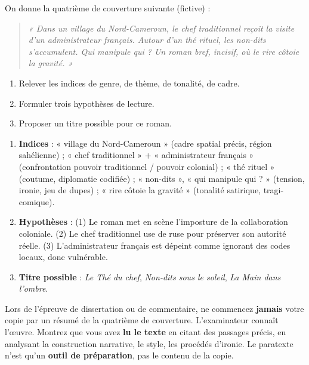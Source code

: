 \documentclass[11pt]{article}
\begin{document}
\begin{exercice}
On donne la quatrième de couverture suivante (fictive) :
\begin{quote}
\emph{« Dans un village du Nord-Cameroun, le chef traditionnel reçoit la visite d'un administrateur français. Autour d'un thé rituel, les non-dits s'accumulent. Qui manipule qui ? Un roman bref, incisif, où le rire côtoie la gravité. »}
\end{quote}
\begin{enumerate}
\item Relever les indices de genre, de thème, de tonalité, de cadre.
\item Formuler trois hypothèses de lecture.
\item Proposer un titre possible pour ce roman.
\end{enumerate}
\end{exercice}

\begin{corrige}[Exercice n°1]
\begin{enumerate}
\item \textbf{Indices} : « village du Nord-Cameroun » (cadre spatial précis, région sahélienne) ; « chef traditionnel » + « administrateur français » (confrontation pouvoir traditionnel / pouvoir colonial) ; « thé rituel » (coutume, diplomatie codifiée) ; « non-dits », « qui manipule qui ? » (tension, ironie, jeu de dupes) ; « rire côtoie la gravité » (tonalité satirique, tragi-comique).
\item \textbf{Hypothèses} : (1) Le roman met en scène l'imposture de la collaboration coloniale. (2) Le chef traditionnel use de ruse pour préserver son autorité réelle. (3) L'administrateur français est dépeint comme ignorant des codes locaux, donc vulnérable.
\item \textbf{Titre possible} : \emph{Le Thé du chef}, \emph{Non-dits sous le soleil}, \emph{La Main dans l'ombre}.
\end{enumerate}
\end{corrige}

\begin{attention}
Lors de l'épreuve de dissertation ou de commentaire, ne commencez \textbf{jamais} votre copie par un résumé de la quatrième de couverture. L'examinateur connaît l'œuvre. Montrez que vous avez \textbf{lu le texte} en citant des passages précis, en analysant la construction narrative, le style, les procédés d'ironie. Le paratexte n'est qu'un \textbf{outil de préparation}, pas le contenu de la copie.
\end{attention}
\end{document}
